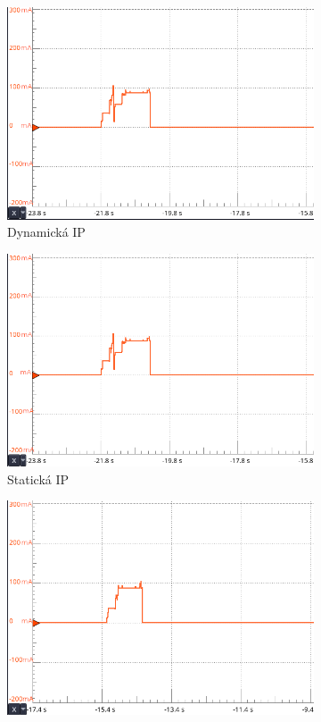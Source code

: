 \documentclass[a4paper, 12pt]{report}
\begin{document}
    \begin{figure}[!ht]
    \centering
    \begin{subfigure}[b]{0.55\linewidth}
        \includegraphics[width=\linewidth]{images/ESP32_network_dynamic}
        \caption{Dynamická IP}
    \end{subfigure}
    \begin{subfigure}[b]{0.55\linewidth}
        \includegraphics[width=\linewidth]{images/ESP32_network_static}
        \caption{Statická IP}
    \end{subfigure}
    \begin{subfigure}[b]{0.55\linewidth}
        \includegraphics[width=\linewidth]{images/ESP32_network_static_security}

\end{subfigure}
\end{figure}
\end{document}
